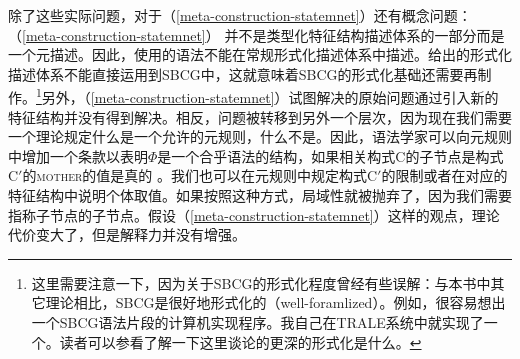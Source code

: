除了这些实际问题，对于（\ref{meta-construction-statemnet}）还有概念问题：（\ref{meta-construction-statemnet}） 并不是类型化特征结构描述体系的一部分而是一个元描述。因此，使用\label{page-sbcg-formalization}的语法不能在常规形式化描述体系中描述。\citet{Richter2004a-u}给出的形式化描述体系不能直接运用到SBCG中，这就意味着SBCG的形式化基础还需要再制作。\footnote{%
 这里需要注意一下，因为关于SBCG的形式化程度曾经有些误解：与本书中其它理论相比，SBCG是很好地形式化的（well-foramlized）。例如，很容易想出一个SBCG语法片段的计算机实现程序。我自己在TRALE系统中就实现了一个。读者可以参看\citet{Richter2004a-u}了解一下这里谈论的更深的形式化是什么。
}另外，（\ref{meta-construction-statemnet}）试图解决的原始问题通过引入新的特征结构并没有得到解决。相反，问题被转移到另外一个层次，因为现在我们需要一个理论规定什么是一个允许的元规则，什么不是。因此，语法学家可以向元规则中增加一个条款以表明$\Phi$是一个合乎语法的结构，如果相关构式C的子节点是构式C$'$的\textsc{mother}的值是真的 。我们也可以在元规则中规定构式C$'$的限制或者在对应的特征结构中说明个体取值。如果按照这种方式，局域性就被抛弃了，因为我们需要指称子节点的子节点。假设（\ref{meta-construction-statemnet}）这样的观点，理论代价变大了，但是解释力并没有增强。
